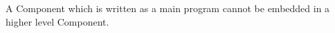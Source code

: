 %


A Component which is written as a main program cannot
be embedded in a higher level Component.

